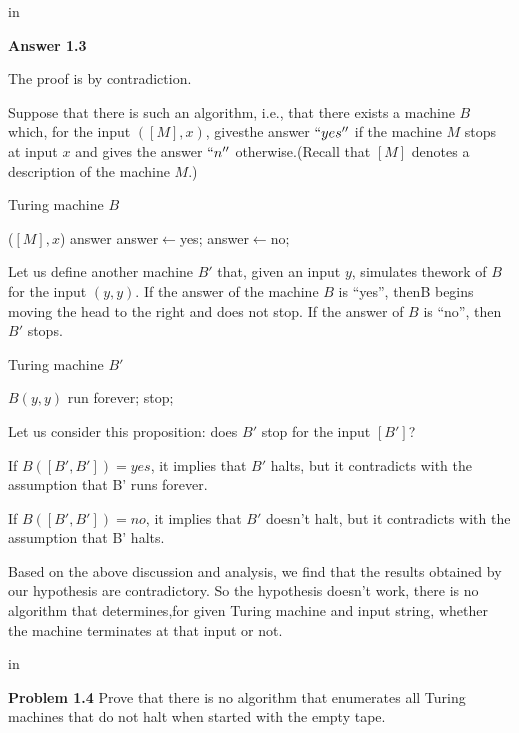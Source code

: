 \documentclass[11pt]{article}
\begin{document}
 in

{\bf Answer 1.3 } 

The proof is by contradiction. 

Suppose that there is such an algorithm, i.e., that there exists a machine $B$ which, for the input $([M], x)$, givesthe answer $``yes''$ if the machine $M$ stops at input $x$ and gives the answer $``n''$ otherwise.(Recall that $[M]$ denotes a description of the machine $M$.)

\begin{algorithm}[htb]  
	\caption{Turing machine $B$}  
	\label{alg:Framwork}  
	\begin{algorithmic}  
		\Require  
		($[M],x$)
		\Ensure  
		answer
		\State answer$\gets$yes;
		\Else
		\State answer$\gets$no;
		\EndIf
	\end{algorithmic}  
\end{algorithm}

Let us define another machine $B'$ that, given an input $y$, simulates thework of $B$ for the input $(y,y)$. If the answer of the machine $B$ is ``yes'', thenB begins moving the head to the right and does not stop. If the answer of $B$ is ``no'', then $B'$ stops.

\begin{algorithm}[htb]  
	\caption{Turing machine $B'$}  
	\label{alg:Framwork}  
	\begin{algorithmic}  
		\Require  
		$B(y,y)$
		\State run forever;
		\Else
		\State stop;
		\EndIf
	\end{algorithmic}  
\end{algorithm}

Let us consider this proposition: does $B'$ stop for the input $[B']$?

If $B([B',B'])=yes$, it implies that $B'$ halts, but it contradicts with the assumption that B' runs forever.

If $B([B',B'])=no$, it implies that $B'$ doesn't halt, but it contradicts with the assumption that B' halts.

Based on the above discussion and analysis, we find that the results obtained by our
hypothesis are contradictory. So the hypothesis doesn’t work, there is no algorithm that determines,for given Turing machine and input string, whether the machine terminates
at that input or not.

 in

\newpage
{\bf Problem 1.4} Prove that there is no algorithm that enumerates all Turing machines that do not halt when started with the empty tape.
\end{document}
